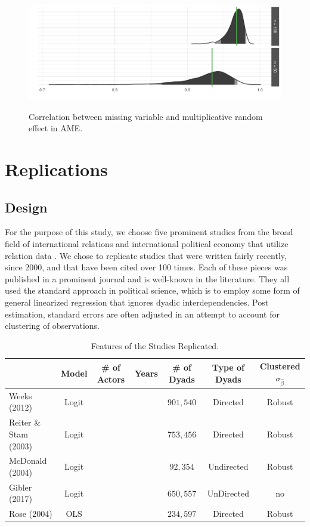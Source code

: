 \documentclass[12pt]{amsart}
\begin{document}
\begin{figure}
	\centering
	\caption{Correlation between missing variable and multiplicative random effect in AME.}
	\label{fig:ameCorr}
	\includegraphics[width=1\textwidth]{ameSimCorr.pdf} \\
\end{figure}

\section{Replications}
 
\subsection{Design}

For the purpose of this study, we choose five prominent studies from the broad field of international relations and international political economy that utilize relation data \citep{mcdonald:2004, reiter:stam:2003, rose:2004, weeks:2012, gibler:2017}. We chose to replicate studies that were written fairly recently, since 2000, and that have been cited over 100 times. Each of these pieces was published in a prominent journal and is well-known in the literature. They all used the standard approach in political science, which is to employ some form of general linearized regression that ignores dyadic interdependencies. Post estimation, standard errors are often adjusted in an attempt to account for clustering of observations.

\begin{table}
\caption{Features of the Studies Replicated. }
	\begin{tabular}{lcccccc}
		 & Model & \# of Actors & Years  & \# of Dyads & Type of Dyads & Clustered $\sigma_{\hat{\beta}}$ \\ \hline\hline
		Weeks (2012) & Logit & & & $901,540$ & Directed & Robust \\
		Reiter \& Stam (2003) & Logit & & & $753,456$ & Directed & Robust \\
		McDonald (2004) & Logit & & & $92,354$ & Undirected & Robust\\		
		Gibler (2017) & Logit & & & $650,557$ & UnDirected & no \\		
		Rose (2004) & OLS & & & $234,597$ & Directed & Robust \\
	\hline\hline
	\end{tabular}
\end{table}
\end{document}
